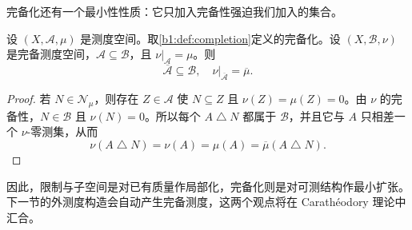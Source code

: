 完备化还有一个最小性性质：它只加入完备性强迫我们加入的集合。

\begin{proposition}
\label{b1:prop:completion-minimal}
设 \((X,\mathcal A,\mu)\) 是测度空间。取\cref{b1:def:completion}定义的完备化。设 \((X,\mathcal B,\nu)\) 是完备测度空间，\(\mathcal A\subseteq\mathcal B\)，且 \(\nu|_{\mathcal A}=\mu\)。则
\[
\overline{\mathcal A}\subseteq\mathcal B,
\quad
\nu|_{\overline{\mathcal A}}=\overline\mu.
\]
\end{proposition}
\begin{proof}
若 \(N\in\mathcal N_\mu\)，则存在 \(Z\in\mathcal A\) 使 \(N\subseteq Z\) 且 \(\nu(Z)=\mu(Z)=0\)。由 \(\nu\) 的完备性，\(N\in\mathcal B\) 且 \(\nu(N)=0\)。所以每个 \(A\mathbin{\triangle}N\) 都属于 \(\mathcal B\)，并且它与 \(A\) 只相差一个 \(\nu\)-零测集，从而
\[
\nu(A\mathbin{\triangle}N)=\nu(A)=\mu(A)=\overline\mu(A\mathbin{\triangle}N).
\]
\end{proof}

因此，限制与子空间是对已有质量作局部化，完备化则是对可测结构作最小扩张。下一节的外测度构造会自动产生完备测度，这两个观点将在 Carathéodory 理论中汇合。
